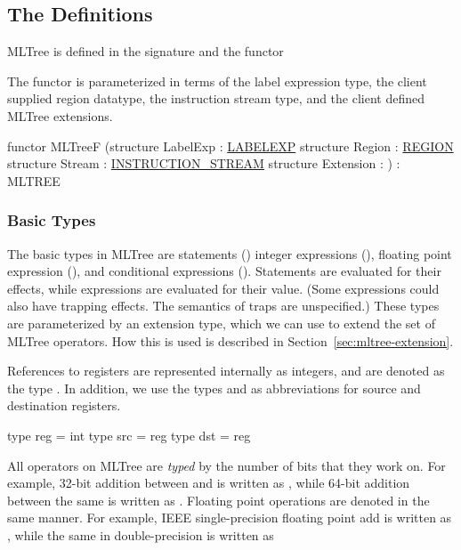\subsection{The Definitions}

MLTree is defined in the signature 
and the functor 

The functor  is parameterized in terms of
the label expression type, the client supplied region datatype,
the instruction stream type, and the client defined MLTree extensions.
\begin{SML}
  functor MLTreeF
    (structure LabelExp : \href{labelexp.html}{LABELEXP}
     structure Region : \href{regions.html}{REGION}
     structure Stream : \href{streams.html}{INSTRUCTION_STREAM}
     structure Extension : 
    ) : MLTREE
\end{SML}

\subsubsection{Basic Types}

  The basic types in MLTree are statements ()
integer expressions (), 
floating point expression (), 
and conditional expressions (). 
Statements are evaluated for their effects,
while expressions are evaluated for their value. (Some expressions
could also have trapping effects.  The semantics of traps are unspecified.)
These types are parameterized by an extension
type, which we can use to extend the set of MLTree 
operators.  How this is used is described in Section~\ref{sec:mltree-extension}.

References to registers are represented internally as integers, and are denoted
as the type . In addition, we use the types  and 
as abbreviations for source and destination registers.
\begin{SML}
   type reg = int
   type src = reg
   type dst = reg
\end{SML}

All operators on MLTree are \emph{typed}
by the number of bits that 
they work on.  For example, 32-bit addition between  and 
is written as , while 64-bit addition between the same
is written as .  Floating point operations are
denoted in the same manner.  For example, IEEE single-precision floating
point add is written as , while the same in
double-precision is written as  

